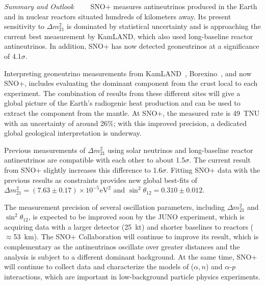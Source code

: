 \documentclass[%
 reprint,
superscriptaddress,
 amsmath,amssymb,
 aps,
]{revtex4-2}
\newcommand{\alphan}{($\alpha, n$) }
\newcommand{\alphap}{$\alpha$-$p$ }
\begin{document}
\smallskip
\textit{Summary and Outlook}~~\textemdash~~
SNO+ measures antineutrinos produced in the Earth and in nuclear reactors situated hundreds of kilometers away. Its present sensitivity to $\Delta m^2_{21}$ is dominated by statistical uncertainty and is approaching the current best measurement by KamLAND, which also used long-baseline reactor antineutrinos.  In addition, SNO+ has now detected geoneutrinos at a significance of 4.1$\sigma$. 

Interpreting geoneutrino measurements from KamLAND~\cite{KamLAND:2022vbm}, Borexino~\cite{Borexino:2019gps}, and now SNO+, includes evaluating the dominant component from the crust local to each experiment. The combination of results from these different sites will give a global picture of the Earth’s radiogenic heat production and can be used to extract the component from the mantle. At SNO+, the measured rate is 49~TNU with an uncertainty of around 26\%; with this improved precision, a dedicated global geological interpretation is underway. 

Previous measurements of $\Delta m^2_{21}$ using solar neutrinos and long-baseline reactor antineutrinos are compatible with each other to about 1.5$\sigma$. 
The current result from SNO+ slightly increases this difference to 1.6$\sigma$.  
Fitting SNO+ data with the previous results as constraints provides new global best-fits of $\Delta m^2_{21} = (7.63\pm0.17) \times 10^{-5} \text{eV}^2$ and $\sin^2\theta_{12} = 0.310\pm0.012$. 

The measurement precision of several oscillation parameters, including $\Delta m^2_{21}$ and $\sin^2\theta_{12}$, is expected to be improved soon by the JUNO experiment, which is acquiring data with a larger detector (25~kt) and shorter baselines to reactors ($\approx$53~km). The SNO+ Collaboration will continue to improve its result, which is complementary as the antineutrinos oscillate over greater distances and the analysis is subject to a different dominant background. 
At the same time, SNO+ will continue to collect data and characterize the models of \alphan and \alphap interactions, which are important in low-background particle physics experiments. 
\end{document}
